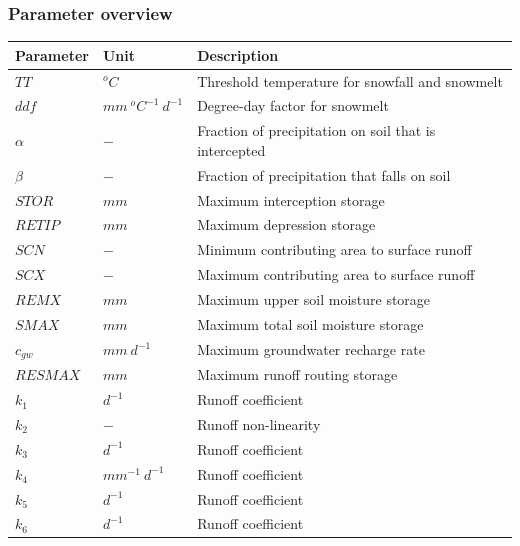 \newpage
\subsubsection{Parameter overview}
\begin{table}[htbp]
  \centering
    \begin{tabular}{lll}
    \toprule
    Parameter & Unit  & Description \\
    \midrule
    $TT$  & $^oC$ & Threshold temperature for snowfall and snowmelt \\
    $ddf$ & $mm~^oC^{-1}~d^{-1}$ & Degree-day factor for snowmelt \\
    $\alpha$ & $-$   & Fraction of precipitation on soil that is intercepted \\
    $\beta$ & $-$   & Fraction of precipitation that falls on soil \\
    $STOR$ & $mm$  & Maximum interception storage \\
    $RETIP$ & $mm$  & Maximum depression storage \\
    $SCN$ & $-$   & Minimum contributing area to surface runoff \\
    $SCX$ & $-$   & Maximum contributing area to surface runoff \\
    $REMX$ & $mm$  & Maximum upper soil moisture storage \\
    $SMAX$ & $mm$  & Maximum total soil moisture storage \\
    $c_{gw}$ & $mm~d^{-1}$ & Maximum groundwater recharge rate \\
    $RESMAX$ & $mm$  & Maximum runoff routing storage \\
    $k_1$ & $d^{-1}$ & Runoff coefficient \\
    $k_2$ & $-$   & Runoff non-linearity \\
    $k_3$ & $d^{-1}$ & Runoff coefficient \\
    $k_4$ & $mm^{-1}~d^{-1}$ & Runoff coefficient \\
    $k_5$ & $d^{-1}$ & Runoff coefficient \\
    $k_6$ & $d^{-1}$ & Runoff coefficient \\
    \bottomrule
    \end{tabular}%
  \label{tab:addlabel}%
\end{table}%

